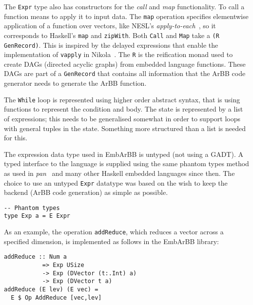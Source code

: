 The {\tt Expr} type also has constructors for the {\em call} and {\em map} 
functionality. To call a function means to apply it to input data. The 
{\tt map} operation specifies elementwise application of a function over 
vectors, like NESL's {\em apply-to-each}~, so it corresponds 
to Haskell's {\tt map} and {\tt zipWith}. Both {\tt Call} and {\tt Map} 
take a {\tt(R GenRecord)}. This is inspired by the delayed expressions 
that enable the implementation of {\tt vapply} in Nikola~. 
The {\tt R} is the reification monad used to create DAGs (directed acyclic 
graphs) from embedded language functions. These DAGs are part of a 
{\tt GenRecord} that contains all information that the ArBB code generator 
needs to generate the ArBB function. 

The {\tt While} loop is represented using higher order abstract syntax, 
that is using functions to represent the condition and body. The state 
is represented by a list of expressions; this needs to be generalised 
somewhat in order to support loops with general tuples in the state. 
Something more structured than a list is needed for this. 

The expression data type used in EmbArBB is untyped (not using a GADT). 
A typed interface to the language is supplied using the same phantom types 
method as used in {\em pan}~ and many other Haskell embedded 
languages since then. The choice to use an untyped {\tt Expr} datatype was 
based on the wish to keep the backend (ArBB code generation) as simple as 
possible. 


\begin{verbatim}
-- Phantom types
type Exp a = E Expr 
\end{verbatim}  

As an example, the operation {\tt addReduce}, which reduces a vector across a specified dimension, is implemented as follows in the EmbArBB library:

\begin{verbatim}
addReduce :: Num a 
           => Exp USize 
           -> Exp (DVector (t:.Int) a) 
           -> Exp (DVector t a) 
addReduce (E lev) (E vec) = 
  E $ Op AddReduce [vec,lev]
\end{verbatim}  

